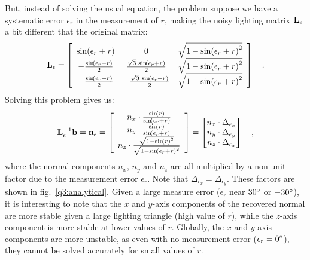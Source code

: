 \documentclass{report}
\begin{document}
But, instead of solving the usual equation, the problem suppose we have a systematic error $\epsilon_r$ in the measurement of $r$, making the noisy lighting matrix $\mathbf{L}_\epsilon$ a bit different that the original matrix:
\begin{equation}
\B{L}_\epsilon = \left[\begin{array}{ccc} \sin\!\left(\epsilon_r + r\right) & 0 & \sqrt{1 - {\sin\!\left(\epsilon_r + r\right)}^2}\\ -\frac{\sin\!\left(\epsilon_r + r\right)}{2} & \frac{\sqrt{3}\, \sin\!\left(\epsilon_r + r\right)}{2} & \sqrt{1 - {\sin\!\left(\epsilon_r + r\right)}^2}\\ -\frac{\sin\!\left(\epsilon_r + r\right)}{2} & -\frac{\sqrt{3}\, \sin\!\left(\epsilon_r + r\right)}{2} & \sqrt{1 - {\sin\!\left(\epsilon_r + r\right)}^2} \end{array}\right]
\quad.
\end{equation}
Solving this problem gives us:
\begin{equation}
\mathbf{L}_\epsilon^{-1}\mathbf{b} = \mathbf{n}_\epsilon = 
\left[\begin{array}{c} n_x \cdot \frac{\sin\!\left(r\right)}{\sin\!\left(\epsilon_r + r\right)}\\ n_y \cdot \frac{\sin\!\left(r\right)}{\sin\!\left(\epsilon_r + r\right)}\\ n_z \cdot \frac{\sqrt{1 - {\sin\!\left(r\right)}^2}}{\sqrt{1 - {\sin\!\left(\epsilon_r + r\right)}^2}} \end{array}\right] =
\begin{bmatrix}
n_x \cdot \Delta_{\epsilon_x} \\
n_y \cdot \Delta_{\epsilon_y} \\
n_z \cdot \Delta_{\epsilon_z} \\
\end{bmatrix}
\quad,
\end{equation}
where the normal components $n_x$, $n_y$ and $n_z$ are all multiplied by a non-unit factor due to the measurement error $\epsilon_r$. Note that $\Delta_{\epsilon_x} = \Delta_{\epsilon_y}$. These factors are shown in fig.~\ref{q3:analytical}. Given a large measure error ($\epsilon_r$ near $30\degree$ or $-30\degree$), it is interesting to note that the $x$ and $y$-axis components of the recovered normal are more stable given a large lighting triangle (high value of $r$), while the $z$-axis component is more stable at lower values of $r$. Globally, the $x$ and $y$-axis components are more unstable, as even with no measurement error ($\epsilon_r = 0\degree$), they cannot be solved accurately for small values of $r$.
\end{document}

